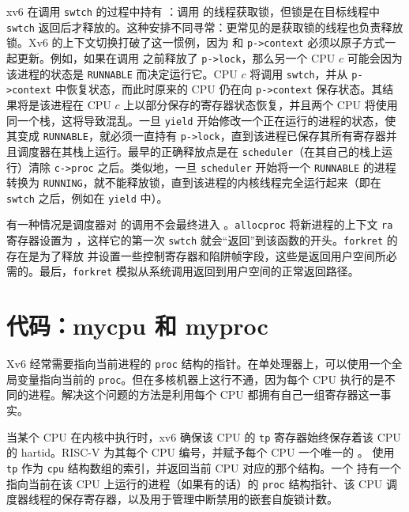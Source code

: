 xv6 在调用 \lstinline{swtch} 的过程中持有 ：调用  的线程获取锁，但锁是在目标线程中 \lstinline{swtch} 返回后才释放的。这种安排不同寻常：更常见的是获取锁的线程也负责释放锁。Xv6 的上下文切换打破了这一惯例，因为  和 \lstinline{p->context} 必须以原子方式一起更新。例如，如果在调用  之前释放了 \lstinline{p->lock}，那么另一个 CPU $c$ 可能会因为该进程的状态是 \lstinline{RUNNABLE} 而决定运行它。CPU $c$ 将调用 \lstinline{swtch}，并从 \lstinline{p->context} 中恢复状态，而此时原来的 CPU 仍在向 \lstinline{p->context} 保存状态。其结果将是该进程在 CPU $c$ 上以部分保存的寄存器状态恢复，并且两个 CPU 将使用同一个栈，这将导致混乱。一旦 \lstinline{yield} 开始修改一个正在运行的进程的状态，使其变成 \lstinline{RUNNABLE}，就必须一直持有 \lstinline{p->lock}，直到该进程已保存其所有寄存器并且调度器在其栈上运行。最早的正确释放点是在 \lstinline{scheduler}（在其自己的栈上运行）清除 \lstinline{c->proc} 之后。类似地，一旦 \lstinline{scheduler} 开始将一个 \lstinline{RUNNABLE} 的进程转换为 \lstinline{RUNNING}，就不能释放锁，直到该进程的内核线程完全运行起来（即在 \lstinline{swtch} 之后，例如在 \lstinline{yield} 中）。

有一种情况是调度器对  的调用不会最终进入 。\lstinline{allocproc} 将新进程的上下文 \lstinline{ra} 寄存器设置为  ，这样它的第一次 \lstinline{swtch} 就会“返回”到该函数的开头。\lstinline{forkret} 的存在是为了释放  并设置一些控制寄存器和陷阱帧字段，这些是返回用户空间所必需的。最后，{\tt forkret} 模拟从系统调用返回到用户空间的正常返回路径。

\section{代码：mycpu 和 myproc}

Xv6 经常需要指向当前进程的 \lstinline{proc} 结构的指针。在单处理器上，可以使用一个全局变量指向当前的 \lstinline{proc}。但在多核机器上这行不通，因为每个 CPU 执行的是不同的进程。解决这个问题的方法是利用每个 CPU 都拥有自己一组寄存器这一事实。

当某个 CPU 在内核中执行时，xv6 确保该 CPU 的 \lstinline{tp} 寄存器始终保存着该 CPU 的 hartid。RISC-V 为其每个 CPU 编号，并赋予每个 CPU 一个唯一的 。  使用 \lstinline{tp} 作为 \lstinline{cpu} 结构数组的索引，并返回当前 CPU 对应的那个结构。一个   持有一个指向当前在该 CPU 上运行的进程（如果有的话）的 \lstinline{proc} 结构指针、该 CPU 调度器线程的保存寄存器，以及用于管理中断禁用的嵌套自旋锁计数。

